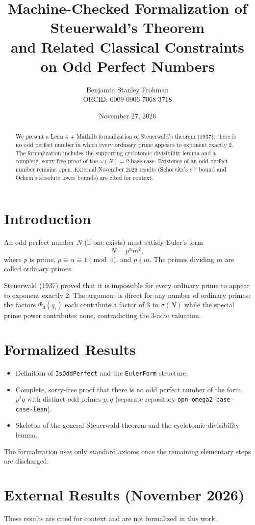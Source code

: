 \documentclass[11pt,a4paper]{article}
\title{Machine-Checked Formalization of Steuerwald's Theorem\\and Related Classical Constraints on Odd Perfect Numbers}
\author{Benjamin Stanley Frohman\\{\small ORCID: 0009-0006-7068-3718}}
\date{November 27, 2026}
\begin{document}
\maketitle

\begin{abstract}
We present a Lean 4 + Mathlib formalization of Steuerwald's theorem (1937): there is no odd perfect number in which every ordinary prime appears to exponent exactly 2. The formalization includes the supporting cyclotomic divisibility lemma and a complete, sorry-free proof of the $\omega(N)=2$ base case. Existence of an odd perfect number remains open. External November 2026 results (Schorvitz's $e^{59}$ bound and Ochem's absolute lower bounds) are cited for context.
\end{abstract}

\section{Introduction}
An odd perfect number $N$ (if one exists) must satisfy Euler's form
\[
N = p^{\alpha} m^2,
\]
where $p$ is prime, $p \equiv \alpha \equiv 1 \pmod{4}$, and $p \nmid m$. The primes dividing $m$ are called ordinary primes.

Steuerwald (1937) proved that it is impossible for every ordinary prime to appear to exponent exactly 2. The argument is direct for any number of ordinary primes: the factors $\Phi_3(q_i)$ each contribute a factor of 3 to $\sigma(N)$ while the special prime power contributes none, contradicting the 3-adic valuation.

\section{Formalized Results}
\begin{itemize}
\item Definition of \texttt{IsOddPerfect} and the \texttt{EulerForm} structure.
\item Complete, sorry-free proof that there is no odd perfect number of the form $p^2 q$ with distinct odd primes $p,q$ (separate repository \texttt{opn-omega2-base-case-lean}).
\item Skeleton of the general Steuerwald theorem and the cyclotomic divisibility lemma.
\end{itemize}

The formalization uses only standard axioms once the remaining elementary steps are discharged.

\section{External Results (November 2026)}
These results are cited for context and are not formalized in this work.
\end{document}
